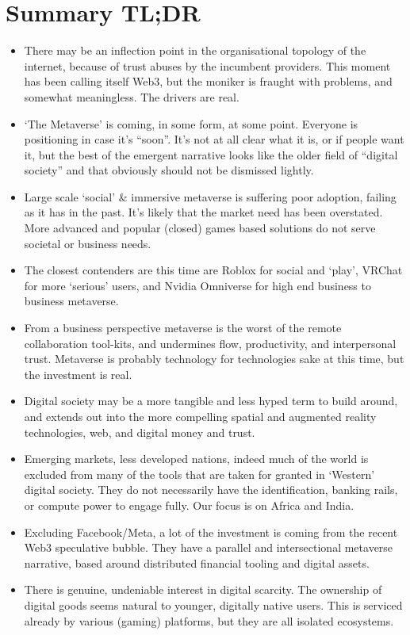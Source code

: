 \section{Summary TL;DR}
\label{sec:tldr}
\begin{itemize}
\item There may be an inflection point in the organisational topology of the internet, because of trust abuses by the incumbent providers. This moment has been calling itself Web3, but the moniker is fraught with problems, and somewhat meaningless. The drivers are real.
\item `The Metaverse' is coming, in some form, at some point. Everyone is positioning in case it's ``soon''. It's not at all clear what it is, or if people want it, but the best of the emergent narrative looks like the older field of ``digital society'' and that obviously should not be dismissed lightly.
\item Large scale `social' \& immersive metaverse is suffering poor adoption, failing as it has in the past. It's likely that the market need has been overstated. More advanced and popular (closed) games based solutions do not serve societal or business needs.
\item The closest contenders are this time are Roblox for social and `play', VRChat for more `serious' users, and Nvidia Omniverse for high end business to business metaverse.
\item From a business perspective metaverse is the worst of the remote collaboration tool-kits, and undermines flow, productivity, and interpersonal trust. Metaverse is probably technology for technologies sake at this time, but the investment is real. 
\item Digital society may be a more tangible and less hyped term to build around, and extends out into the more compelling spatial and augmented reality technologies, web, and digital money and trust.
\item Emerging markets, less developed nations, indeed much of the world is excluded from many of the tools that are taken for granted in `Western' digital society. They do not necessarily have the identification, banking rails, or compute power to engage fully. Our focus is on Africa and India.
\item Excluding Facebook/Meta, a lot of the investment is coming from the recent Web3 speculative bubble. They have a parallel and intersectional metaverse narrative, based around distributed financial tooling and digital assets. 
\item There is genuine, undeniable interest in digital scarcity. The ownership of digital goods seems natural to younger, digitally native users. This is serviced already by various (gaming) platforms, but they are all isolated ecosystems.

\end{itemize}

